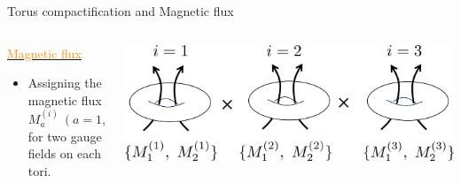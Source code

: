 \documentclass[
  unicode,a4paper,10pt,
  xcolor = {dvipsnames,svgnames},
  hyperref ={colorlinks=true,citecolor=Navy,linkcolor=NavyBlue,urlcolor=purple},
  ja=standard,lualatex
]{beamer}
\begin{document}
\begin{frame}{Torus compactification and Magnetic flux}
  \begin{columns}[t]
    \begin{column}{0.5\textwidth}
      \uline{\textcolor{DarkOrange}{Magnetic flux}}
      \begin{itemize}
        \item
              Assigning the magnetic flux $M_{a}^{(i)}\ (a=1,2)$
              \\
              for two gauge fields on each tori.
      \end{itemize}
    \end{column}
    \begin{column}{0.48\textwidth}
      \vspace*{-15pt}
      \includegraphics[width=1.0\textwidth]{fig/tori_fluxed.png}
    \end{column}
  \end{columns}

\end{frame}
\end{document}

